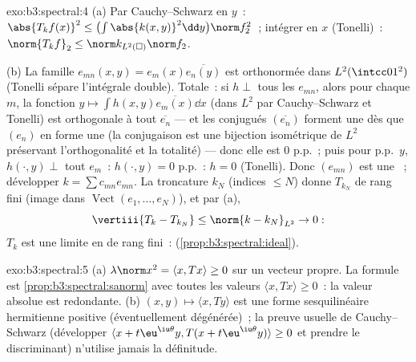\begin{solution}{exo:b3:spectral:4}
(a) Par Cauchy--Schwarz en $y$~: $\abs{T_kf(x)}^2 \leq
\bigl(\int\abs{k(x,y)}^2\dd y\bigr)\norm f_2^2$~; intégrer en
$x$ (Tonelli)~: $\norm{T_kf}_2 \leq \norm k_{L^2(\square)}
\norm f_2$.

(b) La famille $e_{mn}(x,y) = e_m(x)\overline{e_n(y)}$ est
orthonormée dans $L^2(\intcc01^2)$ (Tonelli sépare l'intégrale
double). Totale~: si $h \perp$ tous les $e_{mn}$, alors pour
chaque $m$, la fonction $y \mapsto \int h(x,y)\overline{e_m(x)}\dd
x$ (dans $L^2$ par Cauchy--Schwarz et Tonelli) est orthogonale
à tout $\overline{e_n}$ --- et les conjugués
$(\overline{e_n})$ forment une  dès que
$(e_n)$ en forme une (la conjugaison est une bijection
isométrique de $L^2$ préservant l'orthogonalité et la
totalité) --- donc elle est $0$ p.p.~; puis pour p.p.\ $y$,
$h(\cdot, y) \perp$ tout $e_m$~: $h(\cdot, y) = 0$ p.p.~: $h
= 0$ (Tonelli). Donc $(e_{mn})$ est une ~;
développer $k = \sum c_{mn}e_{mn}$. La troncature $k_N$
(indices $\leq N$) donne $T_{k_N}$ de rang fini (image dans
$\operatorname{Vect}(e_1, \dots, e_N)$), et par (a),
\[
\vertiii{T_k - T_{k_N}} \leq \norm{k - k_N}_{L^2} \to 0 :
\]
$T_k$ est une limite en  de rang fini~:
 (\cref{prop:b3:spectral:ideal}).
\end{solution}

\begin{solution}{exo:b3:spectral:5}
(a) $\lambda\norm x^2 = \langle x, Tx\rangle \geq 0$ sur un
vecteur propre. La formule est
\cref{prop:b3:spectral:sanorm} avec toutes les valeurs
$\langle x, Tx\rangle \geq 0$~: la valeur absolue est
redondante.
(b) $(x, y) \mapsto \langle x, Ty\rangle$ est une forme
sesquilinéaire hermitienne positive (éventuellement
dégénérée)~; la preuve usuelle de Cauchy--Schwarz
(développer $\langle x + t\eu^{\iu\theta}y, T(x +
t\eu^{\iu\theta}y)\rangle \geq 0$ et prendre le discriminant)
n'utilise jamais la définitude.
\end{solution}

